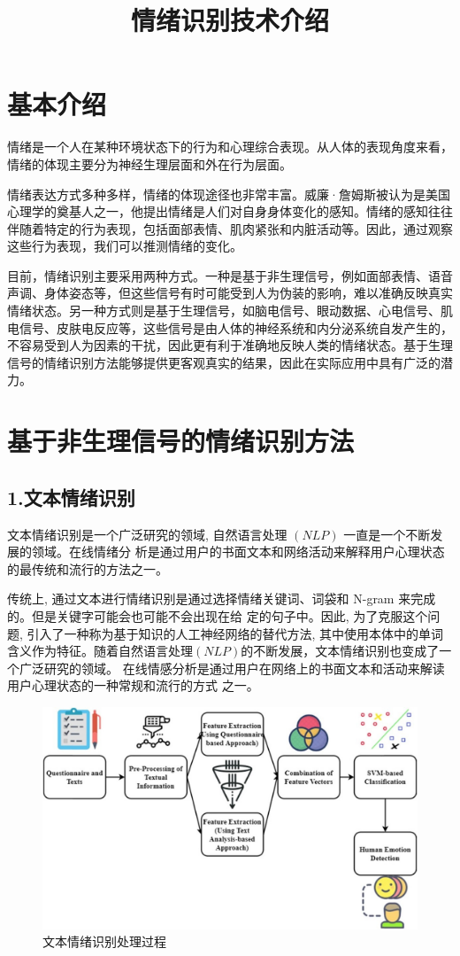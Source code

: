 \documentclass[conference]{IEEEtran}
\begin{document}
\title{情绪识别技术介绍}
\maketitle

\section{基本介绍}
情绪是一个人在某种环境状态下的行为和心理综合表现。从人体的表现角度来看，情绪的体现主要分为神经生理层面和外在行为层面。


情绪表达方式多种多样，情绪的体现途径也非常丰富。威廉·詹姆斯被认为是美国心理学的奠基人之一，他提出情绪是人们对自身身体变化的感知。情绪的感知往往伴随着特定的行为表现，包括面部表情、肌肉紧张和内脏活动等。因此，通过观察这些行为表现，我们可以推测情绪的变化。

目前，情绪识别主要采用两种方式。一种是基于非生理信号，例如面部表情、语音声调、身体姿态等，但这些信号有时可能受到人为伪装的影响，难以准确反映真实情绪状态。另一种方式则是基于生理信号，如脑电信号、眼动数据、心电信号、肌电信号、皮肤电反应等，这些信号是由人体的神经系统和内分泌系统自发产生的，不容易受到人为因素的干扰，因此更有利于准确地反映人类的情绪状态。基于生理信号的情绪识别方法能够提供更客观真实的结果，因此在实际应用中具有广泛的潜力。
\section*{基于非生理信号的情绪识别方法}
\subsection*{1.文本情绪识别}
文本情绪识别是一个广泛研究的领域, 自然语言处理 $(NLP)$ 一直是一个不断发展的领域。在线情绪分 析是通过用户的书面文本和网络活动来解释用户心理状态的最传统和流行的方法之一。

传统上, 通过文本进行情绪识别是通过选择情绪关键词、词袋和 N-gram 来完成的。但是关键字可能会也可能不会出现在给 定的句子中。因此, 为了克服这个问题, 引入了一种称为基于知识的人工神经网络的替代方法, 其中使用本体中的单词含义作为特征。随着自然语言处理$(NLP)$的不断发展，文本情绪识别也变成了一个广泛研究的领域。 在线情感分析是通过用户在网络上的书面文本和活动来解读用户心理状态的一种常规和流行的方式 之一。

\begin{figure}
\centering
 \includegraphics*[scale=0.5]{images/textbasedRecogniton.jpg}   
 \caption[short]{文本情绪识别处理过程}
\end{figure}
\end{document}
